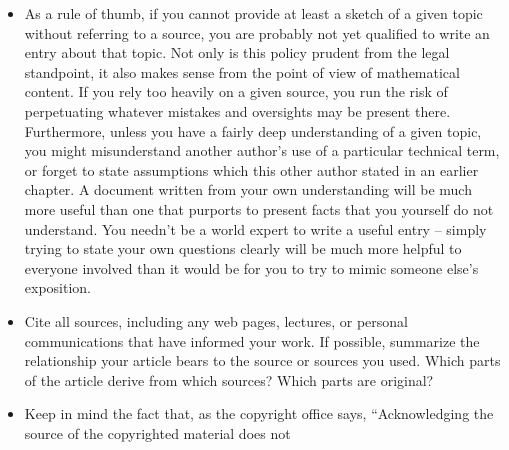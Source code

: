 \begin{itemize}
find proof to the contrary, twentieth century works are likely to be
off-limits. It is of course wise to give a citation so that others
can easily check the assignment (or expiry) of copyright for
themselves -- and perhaps also find additional useful material from
the same source.
\footnote{When dealing with older works, keep the following points in
mind: (a) The law on when copyright expires is somewhat different
for unpublished works, so these need to be treated as a special
case; (b) Before World War II, English was not the dominant language
of the mathematical community. Therefore, older works are more
likely than contemporary works to appear in a language other than
English. Since translation is a creative act, translations are
protected by copyright, even if the work that was translated is in
the public domain. Thus, if you quote at length from an older work
written in a foreign language, you should either do the translation
yourself, or else find a translation which is also in the public
domain (or FDL'ed).}
\item As a rule of thumb, if you cannot provide at least a sketch of a
given topic without referring to a source, you are probably not yet
qualified to write an entry about that topic. Not only is this
policy prudent from the legal standpoint, it also makes sense from the
point of view of mathematical content. If you rely too heavily on a
given source, you run the risk of perpetuating whatever mistakes and
oversights may be present there. Furthermore, unless you have a
fairly deep understanding of a given topic, you might misunderstand
another author's use of a particular technical term, or forget to
state assumptions which this other author stated in an earlier
chapter. A document written from your own understanding will be much
more useful than one that purports to present facts that you
yourself do not understand. You needn't be a world expert to write
a useful entry -- simply trying to state your own questions clearly
will be much more helpful to everyone involved than it would be for
you to try to mimic someone else's exposition.
\item Cite all sources, including any web pages, lectures, or personal
communications that have informed your work. If possible, summarize
the relationship your article bears to the source or sources you
used. Which parts of the article derive from which sources? Which
parts are original?
\item Keep in mind the fact that, as the copyright office says,
``Acknowledging the source of the copyrighted material does not

\end{itemize}
